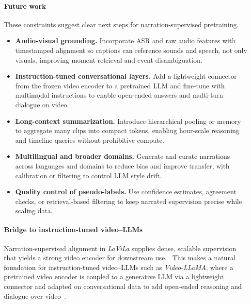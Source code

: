 \begin{enrichment}
\begin{enrichment}
        \paragraph{Future work}
        These constraints suggest clear next steps for narration-supervised pretraining.
        \begin{itemize}
            \item \textbf{Audio-visual grounding.} Incorporate ASR and raw audio features with timestamped alignment so captions can reference sounds and speech, not only visuals, improving moment retrieval and event disambiguation.
            \item \textbf{Instruction-tuned conversational layers.} Add a lightweight connector from the frozen video encoder to a pretrained LLM and fine-tune with multimodal instructions to enable open-ended answers and multi-turn dialogue on video.
            \item \textbf{Long-context summarization.} Introduce hierarchical pooling or memory to aggregate many clips into compact tokens, enabling hour-scale reasoning and timeline queries without prohibitive compute.
            \item \textbf{Multilingual and broader domains.} Generate and curate narrations across languages and domains to reduce bias and improve transfer, with calibration or filtering to control LLM style drift.
            \item \textbf{Quality control of pseudo-labels.} Use confidence estimates, agreement checks, or retrieval-based filtering to keep narrated supervision precise while scaling data.
        \end{itemize}
        
        \paragraph{Bridge to instruction-tuned video–LLMs}
        Narration-supervised alignment in \emph{LaViLa} supplies dense, scalable supervision that yields a strong video encoder for downstream use.~\cite{zhao2022_lavila} This makes a natural foundation for instruction-tuned video–LLMs such as \emph{Video-LLaMA}, where a pretrained video encoder is coupled to a generative LLM via a lightweight connector and adapted on conversational data to add open-ended reasoning and dialogue over video~\cite{zhang2023_videollama,cheng2024_videollama2}.
        
    \end{enrichment}
    

\end{enrichment}
